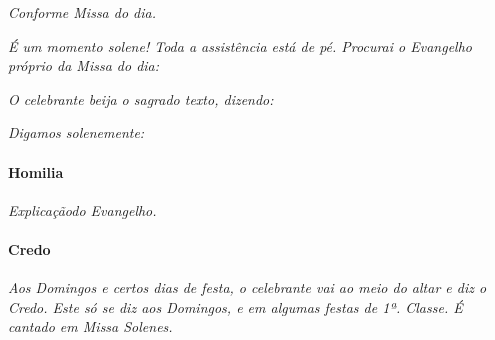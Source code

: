 \emph{Conforme Missa do dia.}

\textit{É um momento solene! Toda a assistência está de pé. Procurai o Evangelho próprio da Missa do dia:}

\begin{paracol}{2}\switchcolumn{}\switchcolumn*{}\switchcolumn{}\switchcolumn*{}\switchcolumn{}\switchcolumn*{}\switchcolumn{}\end{paracol}

\textit{O celebrante beija o sagrado texto, dizendo:}

\begin{paracol}{2}\switchcolumn{}\end{paracol}

\textit{Digamos solenemente:}

\begin{paracol}{2}\switchcolumn{}\end{paracol}

\paragraph{Homilia}

\textit{Explicaçãodo Evangelho.}

\paragraph{Credo}

\textit{Aos Domingos e certos dias de festa, o celebrante vai ao meio do altar e diz o Credo. Este só se diz aos Domingos, e em algumas festas de 1ª. Classe. É cantado em Missa Solenes.}


